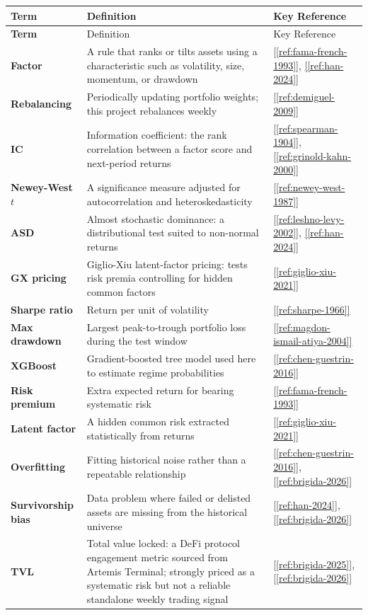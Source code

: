 \documentclass[11pt,a4paper]{article}
\newcommand{\ieeecite}[1]{\hyperref[ref:#1]{[\ref*{ref:#1}]}}
\newcommand{\ieeecitetwo}[2]{\hyperref[ref:#1]{[\ref*{ref:#1}]}, \hyperref[ref:#2]{[\ref*{ref:#2}]}}
\begin{document}
\begin{longtable}{>{\bfseries\color{beigetitle}}p{2.8cm}p{9cm}p{2.4cm}}
\toprule
\rowcolor{tablehead}
Term & Definition & Key Reference \\
\midrule
\endfirsthead
\toprule
\rowcolor{tablehead}
Term & Definition & Key Reference \\
\midrule
\endhead
\bottomrule
\endlastfoot
Factor & A rule that ranks or tilts assets using a characteristic such as volatility, size, momentum, or drawdown & \ieeecitetwo{fama-french-1993}{han-2024} \\
Rebalancing & Periodically updating portfolio weights; this project rebalances weekly & \ieeecite{demiguel-2009} \\
IC & Information coefficient: the rank correlation between a factor score and next-period returns & \ieeecitetwo{spearman-1904}{grinold-kahn-2000} \\
Newey-West $t$ & A significance measure adjusted for autocorrelation and heteroskedasticity & \ieeecite{newey-west-1987} \\
ASD & Almost stochastic dominance: a distributional test suited to non-normal returns & \ieeecitetwo{leshno-levy-2002}{han-2024} \\
GX pricing & Giglio-Xiu latent-factor pricing: tests risk premia controlling for hidden common factors & \ieeecite{giglio-xiu-2021} \\
Sharpe ratio & Return per unit of volatility & \ieeecite{sharpe-1966} \\
Max drawdown & Largest peak-to-trough portfolio loss during the test window & \ieeecite{magdon-ismail-atiya-2004} \\
XGBoost & Gradient-boosted tree model used here to estimate regime probabilities & \ieeecite{chen-guestrin-2016} \\
Risk premium & Extra expected return for bearing systematic risk & \ieeecite{fama-french-1993} \\
Latent factor & A hidden common risk extracted statistically from returns & \ieeecite{giglio-xiu-2021} \\
Overfitting & Fitting historical noise rather than a repeatable relationship & \ieeecitetwo{chen-guestrin-2016}{brigida-2026} \\
Survivorship bias & Data problem where failed or delisted assets are missing from the historical universe & \ieeecitetwo{han-2024}{brigida-2026} \\
TVL & Total value locked: a DeFi protocol engagement metric sourced from Artemis Terminal; strongly priced as a systematic risk but not a reliable standalone weekly trading signal & \ieeecitetwo{brigida-2025}{brigida-2026} \\

\end{longtable}
\end{document}
